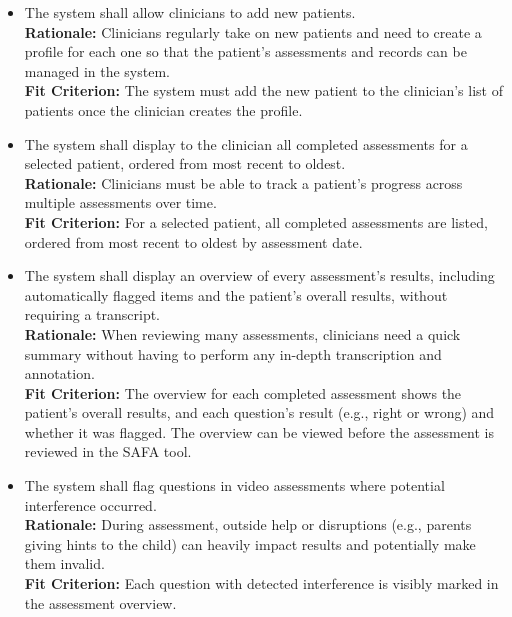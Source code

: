 \documentclass[12pt]{article}
\newcounter{reqnum} %
\newcommand{\rthereqnum}{FR\thereqnum}
\begin{document}
\begin{itemize}
\item[\textbf{\rthereqnum} \label{FR_Label10}:] The system shall allow clinicians to add new patients.
\\ \textbf{Rationale:} Clinicians regularly take on new patients and need to create a profile for each one so that the patient’s assessments and records can be managed in the system.
\\ \textbf{Fit Criterion:} The system must add the new patient to the clinician’s list of patients once the clinician creates the profile.

\item[\textbf{\rthereqnum} \label{FR_Label11}:] The system shall display to the clinician all completed assessments for a selected patient, ordered from most recent to oldest.
\\ \textbf{Rationale:} Clinicians must be able to track a patient's progress across multiple assessments over time.
\\ \textbf{Fit Criterion:} For a selected patient, all completed assessments are listed, ordered from most recent to oldest by assessment date.

\item[\textbf{\rthereqnum} \label{FR_Label12}:] The system shall display an overview of every assessment's results, including automatically flagged items and the patient's overall results, without requiring a transcript.
\\ \textbf{Rationale:} When reviewing many assessments, clinicians need a quick summary without having to perform any in-depth transcription and annotation.
\\ \textbf{Fit Criterion:} The overview for each completed assessment shows the patient's overall results, and each question's result (e.g., right or wrong) and whether it was flagged. The overview can be viewed before the assessment is reviewed in the SAFA tool.

\item[\textbf{\rthereqnum} \label{FR_Label13}:] The system shall flag questions in video assessments where potential interference occurred.
\\ \textbf{Rationale:} During assessment, outside help or disruptions (e.g., parents giving hints to the child) can heavily impact results and potentially make them invalid.
\\ \textbf{Fit Criterion:} Each question with detected interference is visibly marked in the assessment overview.


\end{itemize}
\end{document}
